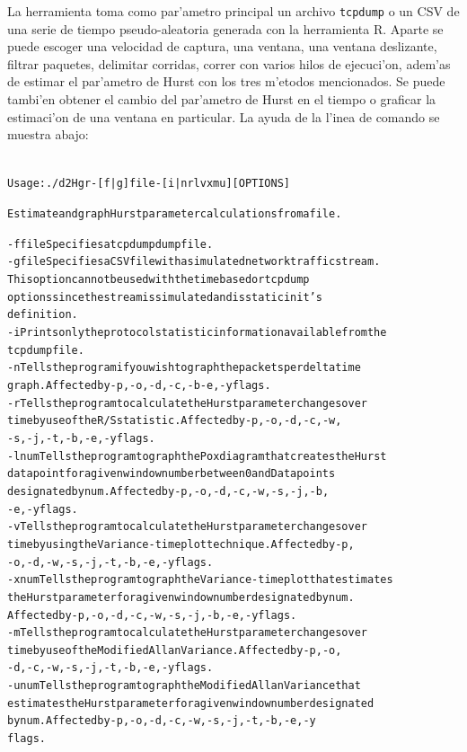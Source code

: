La herramienta toma como par'ametro principal un archivo {\tt tcpdump} o un CSV
de una serie de tiempo pseudo-aleatoria generada con la herramienta R.
Aparte se puede escoger una velocidad de captura, una ventana, una ventana
deslizante, filtrar paquetes, delimitar corridas, correr con varios hilos de
ejecuci'on, adem'as de estimar el par'ametro de Hurst con los tres m'etodos
mencionados. Se puede tambi'en obtener el cambio del par'ametro de Hurst en el
tiempo o graficar la estimaci'on de una ventana en particular. La ayuda de la
l'inea de comando se muestra abajo:

\begin{alltt}
\label{verb:help}
Usage: ./d2Hgr -[f|g] file -[i|nrlvxmu] [OPTIONS]                               

Estimate and graph Hurst parameter calculations from a file.

   -f file   Specifies a tcpdump dump file.
   -g file   Specifies a CSV file with a simulated network traffic stream.
             This option cannot be used with the time based or tcpdump
             options since the stream is simulated and is static in it's
             definition.
   -i        Prints only the protocol statistic information available from the
             tcpdump file.
   -n        Tells the program if you wish to graph the packets per delta time
             graph. Affected by -p, -o, -d, -c, -b -e, -y flags.
   -r        Tells the program to calculate the Hurst parameter changes over
             time by use of the R/S statistic. Affected by -p, -o, -d, -c, -w,
             -s, -j, -t, -b, -e, -y flags.
   -l num    Tells the program to graph the Pox diagram that creates the Hurst
             data point for a given window number between 0 and Datapoints
             designated by num. Affected by -p, -o, -d, -c, -w, -s, -j, -b,
             -e, -y flags.
   -v        Tells the program to calculate the Hurst parameter changes over
             time by using the Variance-time plot technique. Affected by -p,
             -o, -d, -w, -s, -j, -t, -b, -e, -y flags.
   -x num    Tells the program to graph the Variance-time plot that estimates
             the Hurst parameter for a given window number designated by num.
             Affected by -p, -o, -d, -c, -w, -s, -j, -b, -e, -y flags.
   -m        Tells the program to calculate the Hurst parameter changes over
             time by use of the Modified Allan Variance. Affected by -p, -o,
             -d, -c, -w, -s, -j, -t, -b, -e, -y flags.
   -u num    Tells the program to graph the Modified Allan Variance that
             estimates the Hurst parameter for a given window number designated
             by num. Affected by -p, -o, -d, -c, -w, -s, -j, -t, -b, -e, -y
             flags.


\end{alltt}

